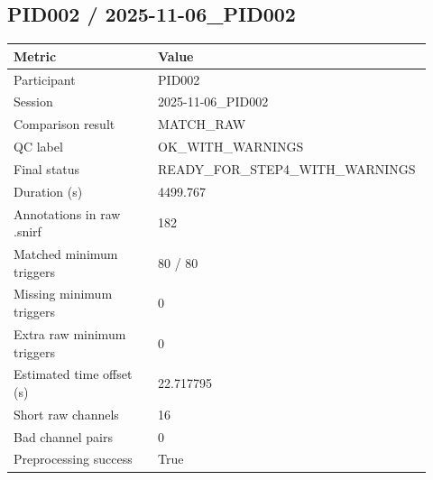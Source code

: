 \subsection*{PID002 / 2025-11-06\_PID002}
\begin{tabular}{p{0.34\linewidth}p{0.58\linewidth}}
\toprule
Metric & Value\\
\midrule
Participant & PID002\\
Session & 2025-11-06\_PID002\\
Comparison result & MATCH\_RAW\\
QC label & OK\_WITH\_WARNINGS\\
Final status & READY\_FOR\_STEP4\_WITH\_WARNINGS\\
Duration (s) & 4499.767\\
Annotations in raw .snirf & 182\\
Matched minimum triggers & 80 / 80\\
Missing minimum triggers & 0\\
Extra raw minimum triggers & 0\\
Estimated time offset (s) & 22.717795\\
Short raw channels & 16\\
Bad channel pairs & 0\\
Preprocessing success & True\\
\bottomrule
\end{tabular}
